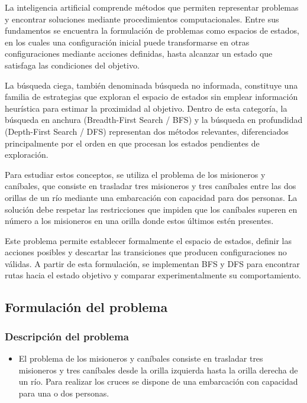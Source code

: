 \documentclass[
  spanish,
]{llncs}
\providecommand{\tightlist}{%
  \setlength{\itemsep}{0pt}\setlength{\parskip}{0pt}}
\begin{document}
La inteligencia artificial comprende métodos que permiten representar
problemas y encontrar soluciones mediante procedimientos
computacionales. Entre sus fundamentos se encuentra la formulación de
problemas como espacios de estados, en los cuales una configuración
inicial puede transformarse en otras configuraciones mediante acciones
definidas, hasta alcanzar un estado que satisfaga las condiciones del
objetivo.

La búsqueda ciega, también denominada búsqueda no informada, constituye
una familia de estrategias que exploran el espacio de estados sin
emplear información heurística para estimar la proximidad al objetivo.
Dentro de esta categoría, la búsqueda en anchura (Breadth-First Search /
BFS) y la búsqueda en profundidad (Depth-First Search / DFS) representan
dos métodos relevantes, diferenciados principalmente por el orden en que
procesan los estados pendientes de exploración.

Para estudiar estos conceptos, se utiliza el problema de los misioneros
y caníbales, que consiste en trasladar tres misioneros y tres caníbales
entre las dos orillas de un río mediante una embarcación con capacidad
para dos personas. La solución debe respetar las restricciones que
impiden que los caníbales superen en número a los misioneros en una
orilla donde estos últimos estén presentes.

Este problema permite establecer formalmente el espacio de estados,
definir las acciones posibles y descartar las transiciones que producen
configuraciones no válidas. A partir de esta formulación, se implementan
BFS y DFS para encontrar rutas hacia el estado objetivo y comparar
experimentalmente su comportamiento.

\subsection{Formulación del problema}\label{formulaciuxf3n-del-problema}

\subsubsection{Descripción del
problema}\label{descripciuxf3n-del-problema}

\begin{itemize}
\tightlist
\item
  El problema de los misioneros y caníbales consiste en trasladar tres
  misioneros y tres caníbales desde la orilla izquierda hasta la orilla
  derecha de un río. Para realizar los cruces se dispone de una
  embarcación con capacidad para una o dos personas.
\end{itemize}
\end{document}
